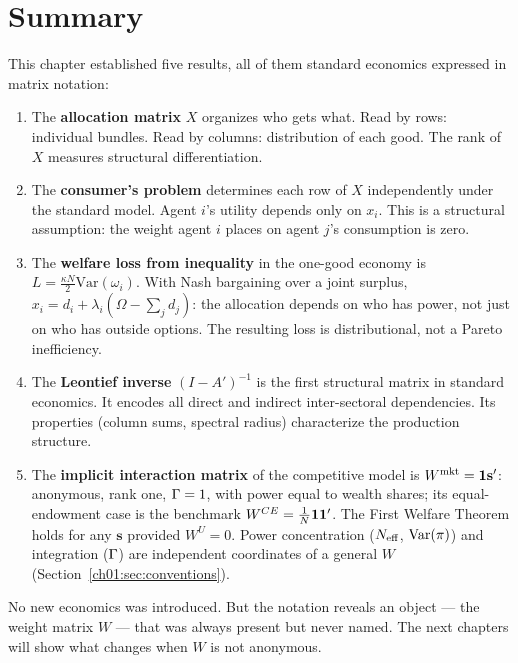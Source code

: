 \documentclass[../structural_economics_book.tex]{subfiles}
\begin{document}
\section{Summary}
\label{ch01:sec:summary}

This chapter established five results, all of them standard economics expressed in matrix notation:

\begin{enumerate}
\item The \textbf{allocation matrix} $X$ organizes who gets what. Read by rows: individual bundles. Read by columns: distribution of each good. The rank of $X$ measures structural differentiation.

\item The \textbf{consumer's problem} determines each row of $X$ independently under the standard model. Agent $i$'s utility depends only on $x_i$. This is a structural assumption: the weight agent $i$ places on agent $j$'s consumption is zero.

\item The \textbf{welfare loss from inequality} in the one-good economy is $L = \frac{\kappa N}{2}\text{Var}(\omega_i)$. With Nash bargaining over a joint surplus, $x_i = d_i + \lambda_i(\Omega - \sum_j d_j)$: the allocation depends on who has power, not just on who has outside options. The resulting loss is distributional, not a Pareto inefficiency.

\item The \textbf{Leontief inverse} $(I - A')^{-1}$ is the first structural matrix in standard economics. It encodes all direct and indirect inter-sectoral dependencies. Its properties (column sums, spectral radius) characterize the production structure.

\item The \textbf{implicit interaction matrix} of the competitive model is $W^{\text{mkt}} = \mathbf{1}\mathbf{s}'$: anonymous, rank one, $\Gamma = 1$, with power equal to wealth shares; its equal-endowment case is the benchmark $W^{CE} = \frac{1}{N}\mathbf{1}\mathbf{1}'$. The First Welfare Theorem holds for any $\mathbf{s}$ provided $W^U = 0$. Power concentration ($N_{\text{eff}}$, $\operatorname{Var}(\pi)$) and integration ($\Gamma$) are independent coordinates of a general $W$ (Section~\ref{ch01:sec:conventions}).
\end{enumerate}

No new economics was introduced. But the notation reveals an object --- the weight matrix $W$ --- that was always present but never named. The next chapters will show what changes when $W$ is not anonymous.
\end{document}

